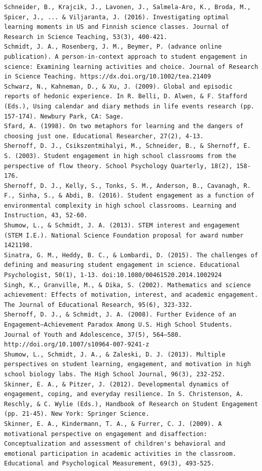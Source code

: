\documentclass[]{book}
\theoremstyle{definition}
\theoremstyle{definition}
\theoremstyle{definition}
\theoremstyle{remark}
\begin{document}
\begin{verbatim}
Schneider, B., Krajcik, J., Lavonen, J., Salmela‐Aro, K., Broda, M., Spicer, J., ... & Viljaranta, J. (2016). Investigating optimal learning moments in US and Finnish science classes. Journal of Research in Science Teaching, 53(3), 400-421.  
Schmidt, J. A., Rosenberg, J. M., Beymer, P. (advance online publication). A person-in-context approach to student engagement in science: Examining learning activities and choice. Journal of Research in Science Teaching. https://dx.doi.org/10.1002/tea.21409  
Schwarz, N., Kahneman, D., & Xu, J. (2009). Global and episodic reports of hedonic experience. In R. Belli, D. Alwen, & F. Stafford (Eds.), Using calendar and diary methods in life events research (pp. 157-174). Newbury Park, CA: Sage.  
Sfard, A. (1998). On two metaphors for learning and the dangers of choosing just one. Educational Researcher, 27(2), 4-13.  
Shernoff, D. J., Csikszentmihalyi, M., Schneider, B., & Shernoff, E. S. (2003). Student engagement in high school classrooms from the perspective of flow theory. School Psychology Quarterly, 18(2), 158-176.  
Shernoff, D. J., Kelly, S., Tonks, S. M., Anderson, B., Cavanagh, R. F., Sinha, S., & Abdi, B. (2016). Student engagement as a function of environmental complexity in high school classrooms. Learning and Instruction, 43, 52-60.  
Shumow, L., & Schmidt, J. A. (2013). STEM interest and engagement (STEM I.E.). National Science Foundation proposal for award number 1421198.  
Sinatra, G. M., Heddy, B. C., & Lombardi, D. (2015). The challenges of defining and measuring student engagement in science. Educational Psychologist, 50(1), 1-13. doi:10.1080/00461520.2014.1002924  
Singh, K., Granville, M., & Dika, S. (2002). Mathematics and science achievement: Effects of motivation, interest, and academic engagement. The Journal of Educational Research, 95(6), 323-332.
Shernoff, D. J., & Schmidt, J. A. (2008). Further Evidence of an Engagement–Achievement Paradox Among U.S. High School Students. Journal of Youth and Adolescence, 37(5), 564–580. http://doi.org/10.1007/s10964-007-9241-z  
Shumow, L., Schmidt, J. A., & Zaleski, D. J. (2013). Multiple perspectives on student learning, engagement, and motivation in high school biology labs. The High School Journal, 96(3), 232-252.  
Skinner, E. A., & Pitzer, J. (2012). Developmental dynamics of engagement, coping, and everyday resilience. In S. Christenson, A. Reschly, & C. Wylie (Eds.), Handbook of Research on Student Engagement (pp. 21-45). New York: Springer Science.  
Skinner, E. A., Kindermann, T. A., & Furrer, C. J. (2009). A motivational perspective on engagement and disaffection: Conceptualization and assessment of children's behavioral and emotional participation in academic activities in the classroom. Educational and Psychological Measurement, 69(3), 493-525.  

\end{verbatim}
\end{document}
